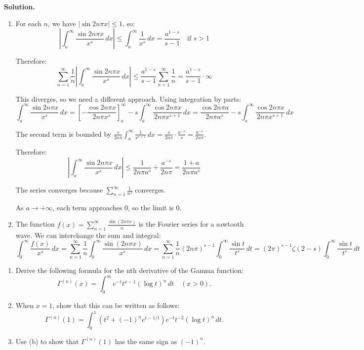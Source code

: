 \noindent\textbf{Solution.}
\begin{enumerate}[label=(\alph*)]
    \item For each $n$, we have $|\sin 2n\pi x| \leq 1$, so:
    \[\left|\int_{a}^{\infty} \frac{\sin 2n\pi x}{x^{s}} \, dx\right| \leq \int_{a}^{\infty} \frac{1}{x^{s}} \, dx = \frac{a^{1-s}}{s-1} \quad \text{if } s > 1\]
    
    Therefore:
    \[\sum_{n=1}^{\infty} \frac{1}{n} \left|\int_{a}^{\infty} \frac{\sin 2n\pi x}{x^{s}} \, dx\right| \leq \frac{a^{1-s}}{s-1} \sum_{n=1}^{\infty} \frac{1}{n} = \frac{a^{1-s}}{s-1} \cdot \infty\]
    
    This diverges, so we need a different approach. Using integration by parts:
    \[\int_{a}^{\infty} \frac{\sin 2n\pi x}{x^{s}} \, dx = \left[-\frac{\cos 2n\pi x}{2n\pi x^{s}}\right]_{a}^{\infty} - s \int_{a}^{\infty} \frac{\cos 2n\pi x}{2n\pi x^{s+1}} \, dx = \frac{\cos 2n\pi a}{2n\pi a^{s}} - s \int_{a}^{\infty} \frac{\cos 2n\pi x}{2n\pi x^{s+1}} \, dx\]
    
    The second term is bounded by $\frac{s}{2n\pi} \int_{a}^{\infty} \frac{1}{x^{s+1}} \, dx = \frac{s}{2n\pi} \cdot \frac{a^{-s}}{s} = \frac{a^{-s}}{2n\pi}$.
    
    Therefore:
    \[\left|\int_{a}^{\infty} \frac{\sin 2n\pi x}{x^{s}} \, dx\right| \leq \frac{1}{2n\pi a^{s}} + \frac{a^{-s}}{2n\pi} = \frac{1 + a}{2n\pi a^{s}}\]
    
    The series converges because $\sum_{n=1}^{\infty} \frac{1}{n^2}$ converges.
    
    As $a \to +\infty$, each term approaches 0, so the limit is 0.
    
    \item The function $f(x) = \sum_{n=1}^{\infty} \frac{\sin(2n\pi x)}{n}$ is the Fourier series for a sawtooth wave. We can interchange the sum and integral:
    \[\int_{0}^{\infty} \frac{f(x)}{x^{s}} \, dx = \sum_{n=1}^{\infty} \frac{1}{n} \int_{0}^{\infty} \frac{\sin(2n\pi x)}{x^{s}} \, dx = \sum_{n=1}^{\infty} \frac{1}{n} (2n\pi)^{s-1} \int_{0}^{\infty} \frac{\sin t}{t^{s}} \, dt = (2\pi)^{s-1} \zeta(2-s) \int_{0}^{\infty} \frac{\sin t}{t^{s}} \, dt\]
\end{enumerate}

\begin{problembox}
\begin{enumerate}[label=(\alph*)]
    \item Derive the following formula for the nth derivative of the Gamma function:
    \[\Gamma^{(n)}(x) = \int_{0}^{\infty} e^{-t} t^{x-1} (\log t)^{n} \, dt \quad (x > 0).\]
    \item When $x = 1$, show that this can be written as follows:
    \[\Gamma^{(n)}(1) = \int_{0}^{1} (t^{2} + (-1)^{n} e^{t-1/t}) e^{-t} t^{-2} (\log t)^{n} \, dt.\]
    \item Use (b) to show that $\Gamma^{(n)}(1)$ has the same sign as $(-1)^{n}$.
\end{enumerate}
\end{problembox}

